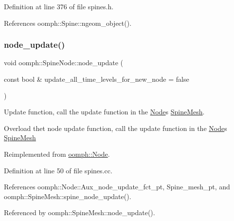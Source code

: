 Definition at line 376 of file spines.\+h.



References oomph\+::\+Spine\+::ngeom\+\_\+object().

\mbox{\label{classoomph_1_1SpineNode_afc47a59bee4ca3e42a56545afe20876d}} 
\subsubsection{\texorpdfstring{node\+\_\+update()}{node\_update()}}
{\footnotesize\ttfamily void oomph\+::\+Spine\+Node\+::node\+\_\+update (\begin{DoxyParamCaption}\item[{const bool \&}]{update\+\_\+all\+\_\+time\+\_\+levels\+\_\+for\+\_\+new\+\_\+node = {\ttfamily false} }\end{DoxyParamCaption})\hspace{0.3cm}{\ttfamily [virtual]}}



Update function, call the update function in the \hyperlink{classoomph_1_1Node}{Node}\textquotesingle{}s \hyperlink{classoomph_1_1SpineMesh}{Spine\+Mesh}. 

Overload thet node update function, call the update function in the \hyperlink{classoomph_1_1Node}{Node}\textquotesingle{}s \hyperlink{classoomph_1_1SpineMesh}{Spine\+Mesh} 

Reimplemented from \hyperlink{classoomph_1_1Node_aecf8c979266300d3609de2b4ddfa3cc8}{oomph\+::\+Node}.



Definition at line 50 of file spines.\+cc.



References oomph\+::\+Node\+::\+Aux\+\_\+node\+\_\+update\+\_\+fct\+\_\+pt, Spine\+\_\+mesh\+\_\+pt, and oomph\+::\+Spine\+Mesh\+::spine\+\_\+node\+\_\+update().



Referenced by oomph\+::\+Spine\+Mesh\+::node\+\_\+update().

\mbox{\label{classoomph_1_1SpineNode_ad805d587c63a24940b7de0fa99fd8101}} 
